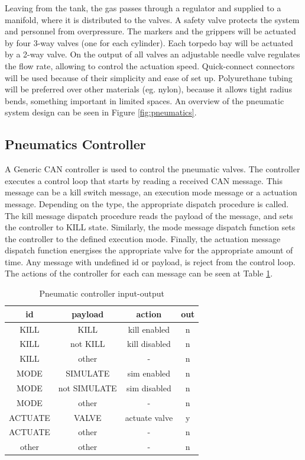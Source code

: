 Leaving from the tank, the gas passes through a regulator and supplied to a manifold, where it is distributed to the valves. A safety valve protects the system and personnel from overpressure. The markers and the grippers will be actuated by four 3-way valves (one for each cylinder). Each torpedo bay will be actuated by a 2-way valve. On the output of all valves an adjustable needle valve regulates the flow rate, allowing to control the actuation speed. Quick-connect connectors will be used because of their simplicity and ease of set up. Polyurethane tubing will be preferred over other materials (eg. nylon), because it allows tight radius bends, something important in limited spaces. An overview of the pneumatic system design can be seen in Figure \ref{fig:pneumatics}.

\subsection{Pneumatics Controller}
A Generic CAN controller is used to control the pneumatic valves. The controller executes a control loop that starts by reading a received CAN message. This message can be a kill switch message, an execution mode message or a actuation message. Depending on the type, the appropriate dispatch procedure is called. The kill message dispatch procedure reads the payload of the message, and sets the controller to KILL state. Similarly, the mode message dispatch function sets the controller to the defined execution mode. Finally, the actuation message dispatch function energises the appropriate valve for the appropriate amount of time. Any message with undefined id or payload, is reject from the control loop. The actions of the controller for each can message can be seen at Table \ref{table:can_msg}.

\begin{table}[!b]
\centering
    \caption{Pneumatic controller input-output}
    \begin{tabular}{|c|c|c|c|} \hline
    \label{table:can_msg}
	\textbf{id} & \textbf{payload} & \textbf{action} & \textbf{out} \\ \hline
        KILL & KILL & kill enabled & n\\ \hline
        KILL & not KILL & kill disabled & n \\ \hline
        KILL & other & - & n \\ \hline
        MODE & SIMULATE & sim enabled & n \\ \hline
		MODE & not SIMULATE & sim disabled & n \\ \hline
		MODE & other & - & n \\ \hline
		ACTUATE & VALVE & actuate valve & y \\ \hline
		ACTUATE & other & - & n \\ \hline
		other & other & - & n \\ \hline
    \end{tabular}
\end{table}